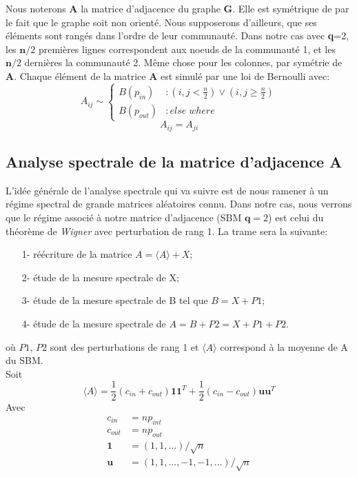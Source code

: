 Nous noterons \textbf{A} la matrice d'adjacence du graphe \textbf{G}.
Elle est symétrique de par le fait que le graphe soit non orienté.
Nous supposerons d'ailleurs, que ses éléments sont rangés dans l'ordre de leur communauté.
Dans notre cas avec \textbf{q}=2, les $\mathbf{n}/2$ premières lignes correspondent aux noeuds de la communauté 1, et les $\mathbf{n}/2$ dernières la communauté 2.
Même chose pour les colonnes, par symétrie de \textbf{A}.
Chaque élément de la matrice \textbf{A} est simulé par une loi de Bernoulli avec: 
\begin{equation} 
 A_{ij} \sim \left\{
  \begin{array}{lr}
    B(p_{in}) & : (i,j < \frac{n}{2}) \lor (i,j \ge \frac{n}{2}) \\
    B(p_{out}) & : else \; where
  \end{array}
\right.\nonumber
\end{equation}
\begin{equation} 
A_{ij} = A_{ji}\nonumber
\end{equation}


\subsection{Analyse spectrale de la matrice d'adjacence \textbf{A}}
L'idée générale de l'analyse spectrale qui va suivre est de nous ramener à un régime spectral de grande matrices aléatoires connu. 
Dans notre cas, nous verrons que le régime associé à notre matrice d'adjacence (SBM $\textbf{q}=2$) est celui du théorème de \textit{Wigner} avec perturbation de rang 1.
La trame sera la suivante:
\begin{itemize}
 	\item[1-] réécriture de la matrice $A = \langle A \rangle + X$;
 	\item[2-] étude de la mesure spectrale de X;
 	\item[3-] étude de la mesure spectrale de B tel que $B = X + P1$;
 	\item[4-] étude de la mesure spectrale de $A = B + P2 = X + P1 + P2$.
 \end{itemize} 
où $P1$, $P2$ sont des perturbations de rang 1 et $\langle A \rangle$ correspond à la moyenne de A du SBM.\\

Soit 
\begin{equation} 
\langle A \rangle = \frac{1}{2}(c_{in} + c_{out})\mathbf{11}^T + \frac{1}{2}(c_{in} - c_{out})\mathbf{uu}^T
\end{equation}
Avec
\begin{align*}
c_{in} &= np_{int} \\
c_{out} &= np_{out}\\
\mathbf{1} &= (1, 1, \ldots)/\sqrt{n}\\
\mathbf{u} &= (1, 1, \ldots, -1, -1, \ldots)/\sqrt{n}
\end{align*}

